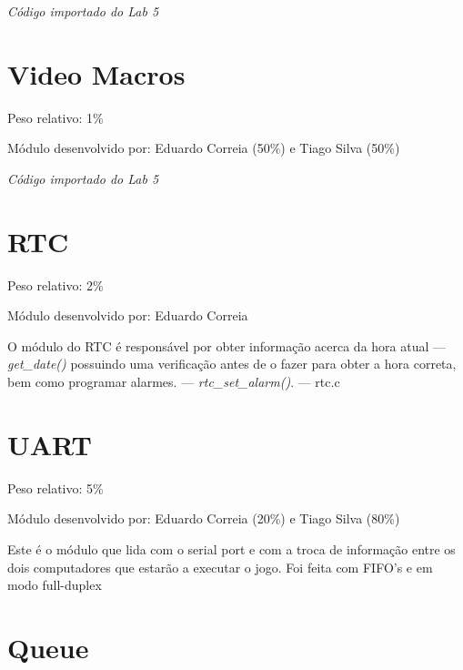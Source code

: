 \documentclass{report}
\begin{document}
\textit{Código importado do Lab 5}\footnotemark[\value{footnote}]

\section{Video Macros}

Peso relativo: 1\%

Módulo desenvolvido por: Eduardo Correia (50\%) e Tiago Silva (50\%)
\newline

\textit{Código importado do Lab 5}\footnotemark[\value{footnote}]


\section{RTC}

Peso relativo: 2\%

Módulo desenvolvido por: Eduardo Correia
\newline

O módulo do RTC é responsável por obter informação acerca da hora atual --- \textit{get\_date()} possuindo uma verificação antes de o fazer para obter a hora correta, bem como programar alarmes. --- \textit{rtc\_set\_alarm()}. --- rtc.c \newline

\section{UART}

Peso relativo: 5\%

Módulo desenvolvido por: Eduardo Correia (20\%) e Tiago Silva (80\%)
\newline

Este é o módulo que lida com o serial port e com a troca de informação entre os dois computadores que estarão a executar o jogo. Foi feita com FIFO's e em modo full-duplex
 
\section{Queue}
\end{document}

